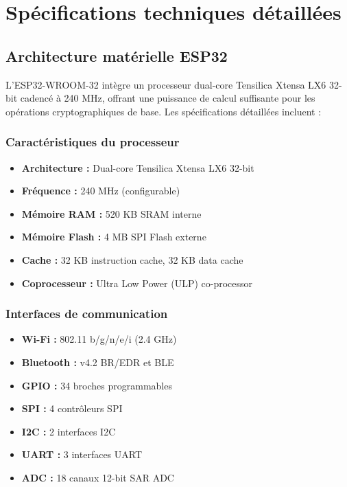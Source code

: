 
\appendix

\chapter{Spécifications techniques détaillées}
\label{app:specifications}

\section{Architecture matérielle ESP32}

L'ESP32-WROOM-32 intègre un processeur dual-core Tensilica Xtensa LX6 32-bit cadencé à 240 MHz, offrant une puissance de calcul suffisante pour les opérations cryptographiques de base. Les spécifications détaillées incluent :

\subsection{Caractéristiques du processeur}

\begin{itemize}
    \item \textbf{Architecture :} Dual-core Tensilica Xtensa LX6 32-bit
    \item \textbf{Fréquence :} 240 MHz (configurable)
    \item \textbf{Mémoire RAM :} 520 KB SRAM interne
    \item \textbf{Mémoire Flash :} 4 MB SPI Flash externe
    \item \textbf{Cache :} 32 KB instruction cache, 32 KB data cache
    \item \textbf{Coprocesseur :} Ultra Low Power (ULP) co-processor
\end{itemize}

\subsection{Interfaces de communication}

\begin{itemize}
    \item \textbf{Wi-Fi :} 802.11 b/g/n/e/i (2.4 GHz)
    \item \textbf{Bluetooth :} v4.2 BR/EDR et BLE
    \item \textbf{GPIO :} 34 broches programmables
    \item \textbf{SPI :} 4 contrôleurs SPI
    \item \textbf{I2C :} 2 interfaces I2C
    \item \textbf{UART :} 3 interfaces UART
    \item \textbf{ADC :} 18 canaux 12-bit SAR ADC
\end{itemize}

